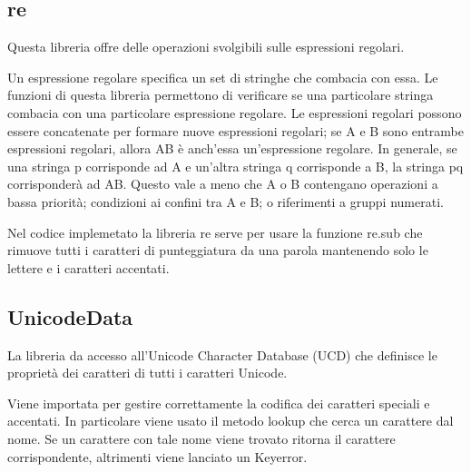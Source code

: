 \subsection{re}
Questa libreria offre delle operazioni svolgibili sulle espressioni regolari.

Un espressione regolare specifica un set di stringhe che combacia con essa. Le funzioni di questa libreria permettono di verificare se una particolare stringa combacia con una particolare espressione regolare.
Le espressioni regolari possono essere concatenate per formare nuove espressioni regolari; se A e B sono entrambe espressioni regolari, allora AB è anch'essa un'espressione regolare. In generale, se una stringa p corrisponde ad A e un'altra stringa q corrisponde a B, la stringa pq corrisponderà ad AB. Questo vale a meno che A o B contengano operazioni a bassa priorità; condizioni ai confini tra A e B; o riferimenti a gruppi numerati. 

Nel codice implemetato la libreria re serve per usare la funzione re.sub che rimuove tutti i caratteri di punteggiatura da una parola mantenendo solo le lettere e i caratteri accentati.
\subsection{UnicodeData}
La libreria da accesso all'Unicode Character Database (UCD) che definisce le proprietà dei caratteri di tutti i caratteri Unicode. 


Viene importata per gestire correttamente la codifica dei caratteri speciali e accentati.
In particolare viene usato il metodo lookup che cerca un carattere dal nome. Se un carattere con tale nome viene trovato ritorna il carattere corrispondente, altrimenti viene lanciato un Keyerror.


